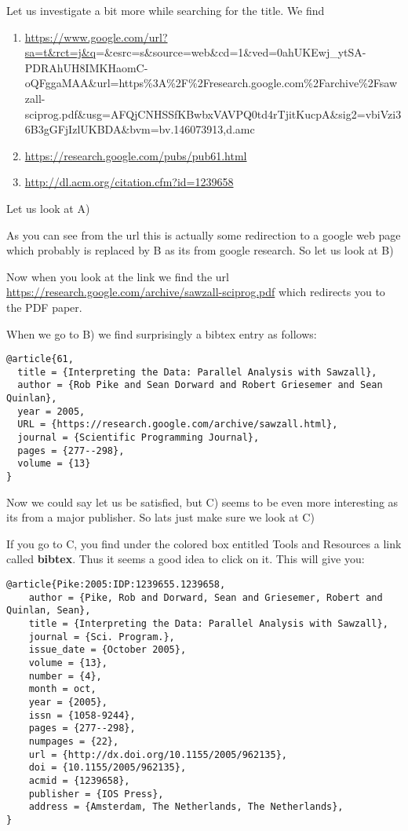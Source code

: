 Let us investigate a bit more while searching for the title. We find

\begin{enumerate}
\def\labelenumi{\Alph{enumi})}
\item
  \url{https://www.google.com/url?sa=t\&rct=j\&q}=\&esrc=s\&source=web\&cd=1\&ved=0ahUKEwj\_ytSA-PDRAhUH8IMKHaomC-oQFggaMAA\&url=https\%3A\%2F\%2Fresearch.google.com\%2Farchive\%2Fsawzall-sciprog.pdf\&usg=AFQjCNHSSfKBwbxVAVPQ0td4rTjitKucpA\&sig2=vbiVzi36B3gGFjIzlUKBDA\&bvm=bv.146073913,d.amc
\item
  \url{https://research.google.com/pubs/pub61.html}
\item
  \url{http://dl.acm.org/citation.cfm?id=1239658}
\end{enumerate}

Let us look at A)

As you can see from the url this is actually some redirection to a google
web page which probably is replaced by B as its from google research. So
let us look at B)

Now when you look at the link we find the url
\url{https://research.google.com/archive/sawzall-sciprog.pdf} which
redirects you to the PDF paper.

When we go to B) we find surprisingly a bibtex entry as follows:

\begin{verbatim}
@article{61,
  title = {Interpreting the Data: Parallel Analysis with Sawzall},
  author = {Rob Pike and Sean Dorward and Robert Griesemer and Sean Quinlan},
  year = 2005,
  URL = {https://research.google.com/archive/sawzall.html},
  journal = {Scientific Programming Journal},
  pages = {277--298},
  volume = {13}
}
\end{verbatim}

Now we could say let us be satisfied, but C) seems to be even more
interesting as its from a major publisher. So lats just make sure we
look at C)

If you go to C, you find under the colored box entitled Tools and
Resources a link called \textbf{bibtex}. Thus it seems a good idea to
click on it. This will give you:

\begin{verbatim}
@article{Pike:2005:IDP:1239655.1239658,
    author = {Pike, Rob and Dorward, Sean and Griesemer, Robert and Quinlan, Sean},
    title = {Interpreting the Data: Parallel Analysis with Sawzall},
    journal = {Sci. Program.},
    issue_date = {October 2005},
    volume = {13},
    number = {4},
    month = oct,
    year = {2005},
    issn = {1058-9244},
    pages = {277--298},
    numpages = {22},
    url = {http://dx.doi.org/10.1155/2005/962135},
    doi = {10.1155/2005/962135},
    acmid = {1239658},
    publisher = {IOS Press},
    address = {Amsterdam, The Netherlands, The Netherlands},
}
\end{verbatim}

